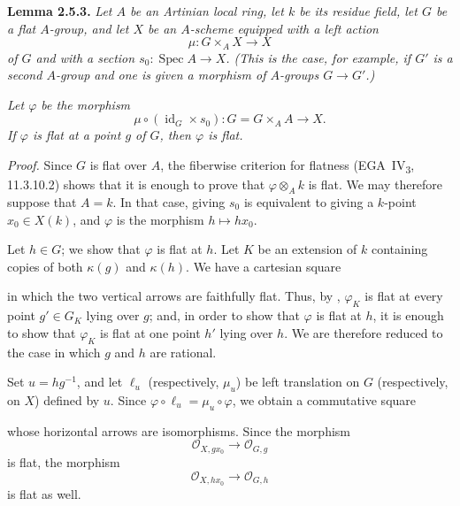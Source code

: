 
\medskip
{}\label{lem:sga3-VIA-2.5.3}%
\noindent\textbf{Lemma 2.5.3.}%
\textit{Let \(A\) be an Artinian local ring, let \(k\) be its residue
field, let \(G\) be a flat \(A\)-group, and let \(X\) be an \(A\)-scheme
equipped with a left action
\[
  \mu:G\times_AX\longrightarrow X
\]
of \(G\) and with a section \(s_0:\operatorname{Spec}A\to X\).
(This is the case, for example, if \(G'\) is a second \(A\)-group and
one is given a morphism of \(A\)-groups \(G\to G'\).)}

\textit{Let \(\varphi\) be the morphism
\[
  \mu\circ(\operatorname{id}_G\times s_0):
  G=G\times_AA\longrightarrow X.
\]
If \(\varphi\) is flat at a point \(g\) of \(G\), then \(\varphi\) is
flat.}

\noindent\textit{Proof.}
Since \(G\) is flat over \(A\), the fiberwise criterion for flatness
(EGA~IV\textsubscript{3}, 11.3.10.2) shows that it is enough to prove
that \(\varphi\otimes_Ak\) is flat. We may therefore suppose that
\(A=k\). In that case, giving \(s_0\) is equivalent to giving a
\(k\)-point \(x_0\in X(k)\), and \(\varphi\) is the morphism
\(h\mapsto hx_0\).

Let \(h\in G\); we show that \(\varphi\) is flat at \(h\). Let \(K\) be
an extension of \(k\) containing copies of both \(\kappa(g)\) and
\(\kappa(h)\). We have a cartesian square
\begin{center}
  \label{diag:sga3-VIA-2.5.3-basechange}%
\end{center}
in which the two vertical arrows are faithfully flat. Thus, by
, \(\varphi_K\) is flat at every point
\(g'\in G_K\) lying over \(g\); and, in order to show that \(\varphi\)
is flat at \(h\), it is enough to show that \(\varphi_K\) is flat at
one point \(h'\) lying over \(h\). We are therefore reduced to the case
in which \(g\) and \(h\) are rational.

Set \(u=hg^{-1}\), and let \(\ell_u\) (respectively, \(\mu_u\)) be left
translation on \(G\) (respectively, on \(X\)) defined by \(u\). Since
\(\varphi\circ\ell_u=\mu_u\circ\varphi\), we obtain a commutative
square
\begin{center}
  \label{diag:sga3-VIA-2.5.3-translations}%
\end{center}
whose horizontal arrows are isomorphisms. Since the morphism
\[
  \mathcal O_{X,gx_0}\longrightarrow\mathcal O_{G,g}
\]
is flat, the morphism
\[
  \mathcal O_{X,hx_0}\longrightarrow\mathcal O_{G,h}
\]
is flat as well.

